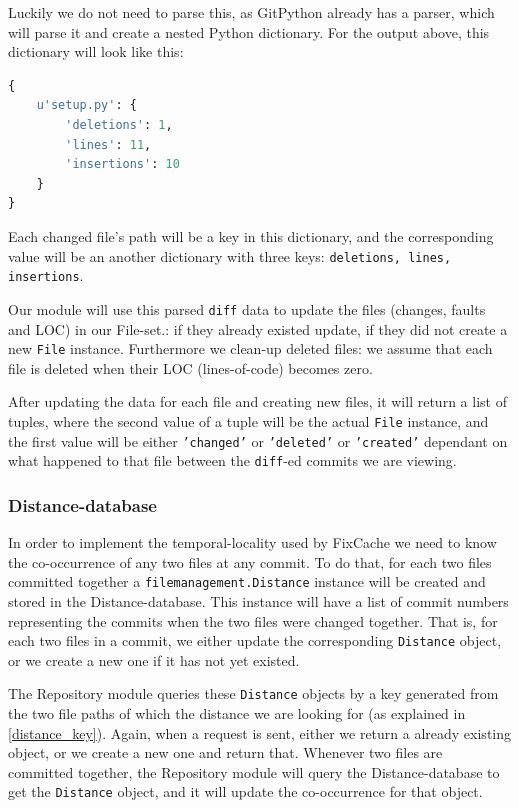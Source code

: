 \documentclass[12pt,twoside,notitlepage]{report}
\newcommand{\fxch}{FixCache}
\begin{document}
\clearpage
Luckily we do not need to parse this, as GitPython already has a parser, which will parse it and create a nested Python dictionary. For the output above, this dictionary will look like this:

\begin{lstlisting}[language=Python]
{ 
	u'setup.py': {
    	'deletions': 1,
	 	'lines': 11,
	 	'insertions': 10
	}
}
\end{lstlisting}

Each changed file's path will be a key in this dictionary, and the corresponding value will be an another dictionary with three keys: \texttt{deletions, lines, insertions}. 

Our module will use this parsed \texttt{diff} data to update the files (changes, faults and LOC) in our File-set.: if they already existed update, if they did not create a new \texttt{File} instance. Furthermore we clean-up deleted files: we assume that each file is deleted when their LOC (lines-of-code) becomes zero.

After updating the data for each file and creating new files, it will return a list of tuples, where the second value of a tuple will be the actual \texttt{File} instance, and the first value will be either \texttt{'changed'} or \texttt{'deleted'} or \texttt{'created'} dependant on what happened to that file between the \texttt{diff}-ed commits we are viewing.
\subsubsection*{Distance-database}
In order to implement the temporal-locality used by \fxch{} we need to know the co-occurrence of any two files at any commit. To do that, for each two files committed together a \texttt{filemanagement.Distance} instance will be created and stored in the Distance-database. This instance will have a list of commit numbers representing the commits when the two files were changed together. That is, for each two files in a commit, we either update the corresponding \texttt{Distance} object, or we create a new one if it has not yet existed.

The Repository module queries these \texttt{Distance} objects by a key generated from the two file paths of which the distance we are looking for (as explained in \ref{distance_key}). Again, when a request is sent, either we return a already existing object, or we create a new one and return that. Whenever two files are committed together, the Repository module will query the Distance-database to get the \texttt{Distance} object, and it will update the co-occurrence for that object.
\end{document}
